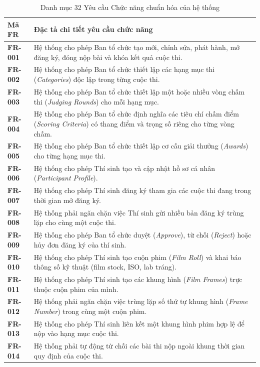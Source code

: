 \begin{table}[!ht]
\centering
\caption{Danh mục 32 Yêu cầu Chức năng chuẩn hóa của hệ thống}
\label{tab:c2_fr}
\scriptsize
\begin{tabularx}{\textwidth}{p{1.8cm}>{\raggedright\arraybackslash}X}
\toprule
\textbf{Mã FR} & \textbf{Đặc tả chi tiết yêu cầu chức năng} \\
\midrule
\textbf{FR-001} & Hệ thống cho phép Ban tổ chức tạo mới, chỉnh sửa, phát hành, mở đăng ký, đóng nộp bài và khóa kết quả cuộc thi. \\
\textbf{FR-002} & Hệ thống cho phép Ban tổ chức thiết lập các hạng mục thi (\textit{Categories}) độc lập trong từng cuộc thi. \\
\textbf{FR-003} & Hệ thống cho phép Ban tổ chức thiết lập một hoặc nhiều vòng chấm thi (\textit{Judging Rounds}) cho mỗi hạng mục. \\
\textbf{FR-004} & Hệ thống cho phép Ban tổ chức định nghĩa các tiêu chí chấm điểm (\textit{Scoring Criteria}) có thang điểm và trọng số riêng cho từng vòng chấm. \\
\textbf{FR-005} & Hệ thống cho phép Ban tổ chức thiết lập cơ cấu giải thưởng (\textit{Awards}) cho từng hạng mục thi. \\
\textbf{FR-006} & Hệ thống cho phép Thí sinh tạo và cập nhật hồ sơ cá nhân (\textit{Participant Profile}). \\
\textbf{FR-007} & Hệ thống cho phép Thí sinh đăng ký tham gia các cuộc thi đang trong thời gian mở đăng ký. \\
\textbf{FR-008} & Hệ thống phải ngăn chặn việc Thí sinh gửi nhiều bản đăng ký trùng lặp cho cùng một cuộc thi. \\
\textbf{FR-009} & Hệ thống cho phép Ban tổ chức duyệt (\textit{Approve}), từ chối (\textit{Reject}) hoặc hủy đơn đăng ký của thí sinh. \\
\textbf{FR-010} & Hệ thống cho phép Thí sinh tạo cuộn phim (\textit{Film Roll}) và khai báo thông số kỹ thuật (film stock, ISO, lab tráng). \\
\textbf{FR-011} & Hệ thống cho phép Thí sinh tạo các khung hình (\textit{Film Frames}) trực thuộc cuộn phim của mình. \\
\textbf{FR-012} & Hệ thống phải ngăn chặn việc trùng lặp số thứ tự khung hình (\textit{Frame Number}) trong cùng một cuộn phim. \\
\textbf{FR-013} & Hệ thống cho phép Thí sinh liên kết một khung hình phim hợp lệ để nộp vào hạng mục cuộc thi. \\
\textbf{FR-014} & Hệ thống phải tự động từ chối các bài thi nộp ngoài khung thời gian quy định của cuộc thi. \\

\end{tabularx}
\end{table}

